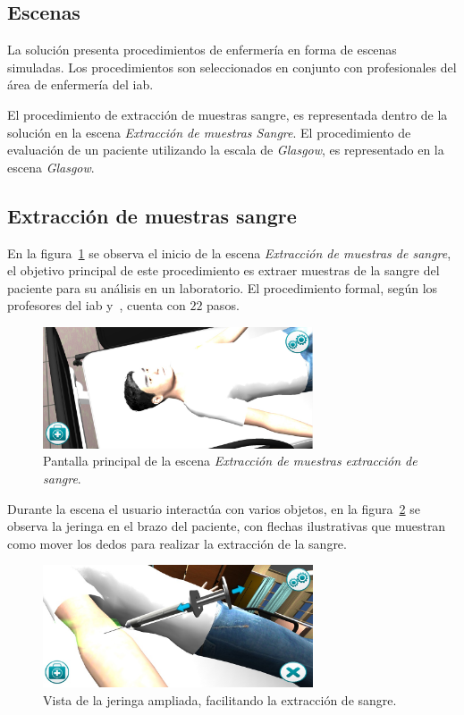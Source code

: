 \subsection{Escenas}

La solución presenta procedimientos de enfermería en forma de escenas simuladas.
Los procedimientos son seleccionados en conjunto con profesionales del área de
enfermería del \gls{iab}. 

El procedimiento de extracción de muestras sangre, es representada dentro de la
solución en la escena \emph{Extracción de muestras Sangre}. El procedimiento de
evaluación de un paciente utilizando la escala de \textit{Glasgow}, es
representado en la escena \emph{Glasgow}.

\subsection{Extracción de muestras sangre}

En la figura~\ref{fig:hemocultivo_principal} se observa el inicio de la escena
\emph{Extracción de muestras de sangre}, el objetivo principal de este
procedimiento es extraer muestras de la sangre del paciente para su análisis en
un laboratorio. El procedimiento formal, según los profesores del
\gls{iab} y~\cite{oms:extraccion}, cuenta con $22$ pasos.

\begin{figure}[H] 
\centering 
\includegraphics[width=8cm]{../solucion/images/hemocultivo_principal.jpg}
\caption{Pantalla principal de la escena \emph{Extracción de muestras extracción
        de sangre}.}
\label{fig:hemocultivo_principal}
\end{figure}

Durante la escena el usuario interactúa con varios objetos, en la
figura~\ref{fig:hemocultivo_jeringa_zoom} se observa la jeringa en el brazo del
paciente, con flechas ilustrativas que muestran como mover los dedos para
realizar la extracción de la sangre.

\begin{figure}
\centering 
\includegraphics[width=8cm]{../solucion/images/hemocultivo_jeringa_ampliada.jpg}
\caption{Vista de la jeringa ampliada, facilitando la extracción de sangre.}
\label{fig:hemocultivo_jeringa_zoom}
\end{figure}

